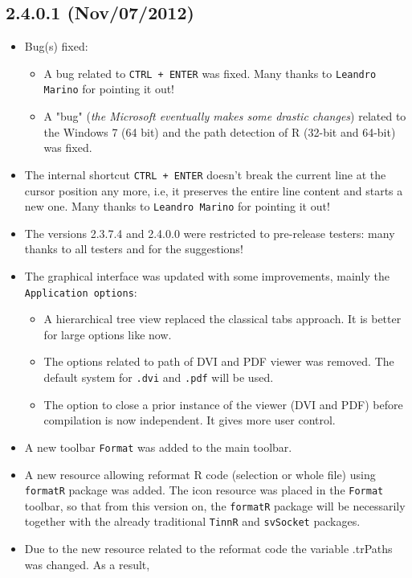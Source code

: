 \subsection*{2.4.0.1 (Nov/07/2012)}
\begin{itemize}
  \item Bug(s) fixed:
    \begin{itemize}
      \item A bug related to \texttt{CTRL + ENTER} was fixed. Many thanks to \texttt{Leandro Marino} for pointing it out!
      \item A "bug" (\textit{the Microsoft eventually makes some drastic changes}) related to the Windows 7 (64 bit)
        and the path detection of R (32-bit and 64-bit) was fixed.
    \end{itemize}
  \item The internal shortcut \texttt{CTRL + ENTER} doesn't break the current line at the cursor position any more, i.e, it preserves
    the entire line content and starts a new one. Many thanks to \texttt{Leandro Marino} for pointing it out!
  \item The versions 2.3.7.4 and 2.4.0.0 were restricted to pre-release testers: many thanks to all testers and for the suggestions!
  \item The graphical interface was updated with some improvements, mainly the \texttt{Application options}:
    \begin{itemize}
      \item A hierarchical tree view replaced the classical tabs approach. It is better for large options like now.
      \item The options related to path of DVI and PDF viewer was removed. The default system for \texttt{.dvi} and \texttt{.pdf} will be used.
      \item The option to close a prior instance of the viewer (DVI and PDF) before compilation is now independent. It gives more user control.
    \end{itemize}
  \item A new toolbar \texttt{Format} was added to the main toolbar.
  \item A new resource allowing reformat R code (selection or whole file) using \texttt{formatR} package was added. 
    The icon resource was placed in the \texttt{Format} toolbar, so that from this version on,
    the \texttt{formatR} package will be necessarily together with the already traditional \texttt{TinnR} and \texttt{svSocket} packages.
  \item Due to the new resource related to the reformat code the variable .trPaths was changed. As a result,

\end{itemize}
